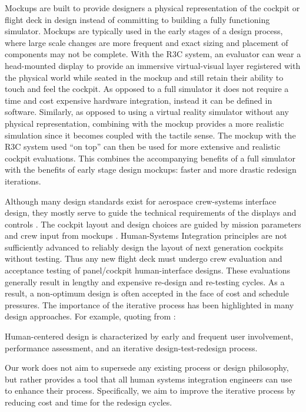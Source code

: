 Mockups are built to provide designers a physical representation of the cockpit or flight deck in design instead of committing to building a fully functioning simulator.
Mockups are typically used in the early stages of a design process, where large scale changes are more frequent and exact sizing and placement of components may not be complete.
With the R3C system, an evaluator can wear a head-mounted display to provide an immersive virtual-visual layer registered with the physical world while seated in the mockup and still retain their ability to touch and feel the cockpit.
As opposed to a full simulator it does not require a time and cost expensive hardware integration, instead it can be defined in software.
Similarly, as opposed to using a virtual reality simulator without any physical representation, combining with the mockup provides a more realistic simulation since it becomes coupled with the tactile sense.
The mockup with the R3C system used ``on top'' can then be used for more extensive and realistic cockpit evaluations.
This combines the accompanying benefits of a full simulator with the benefits of early stage design mockups: faster and more drastic redesign iterations.

Although many design standards exist for aerospace crew-systems interface design, they mostly serve to guide the technical requirements of the displays and controls \citep{nasa_human_2010,nasa_nasa_2015,us_department_of_defense_department_1999}.
The cockpit layout and design choices are guided by mission parameters and crew input from mockups \citep{sexton_cockpitcrew_1988,jacobsen_crew_2010,zea_development_2012}.
Human-Systems Integration principles are not sufficiently advanced to reliably design the layout of next generation cockpits without testing.
Thus any new flight deck must undergo crew evaluation and acceptance testing of panel/cockpit human-interface designs.
These evaluations generally result in lengthy and expensive re-design and re-testing cycles.
As a result, a non-optimum design is often accepted in the face of cost and schedule pressures.
The importance of the iterative process has been highlighted in many design approaches.
For example, quoting from \citet{nasa_nasa_2015}:
\begin{displayquote}
Human-centered design \textelp is characterized by early and frequent user involvement, performance assessment, and an iterative design-test-redesign process.
\end{displayquote}
Our work does not aim to supersede any existing process or design philosophy, but rather provides a tool that all human systems integration engineers can use to enhance their process.
Specifically, we aim to improve the iterative process by reducing cost and time for the redesign cycles.

